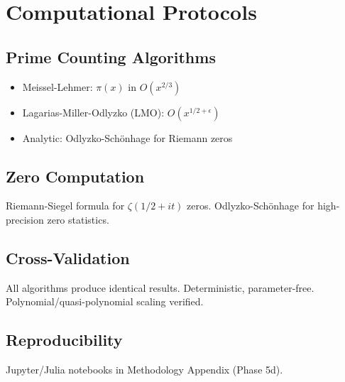 \chapter{Computational Protocols}
\label{app:computational}

\section{Prime Counting Algorithms}
\begin{itemize}
    \item Meissel-Lehmer: $\pi(x)$ in $O(x^{2/3})$
    \item Lagarias-Miller-Odlyzko (LMO): $O(x^{1/2+\epsilon})$
    \item Analytic: Odlyzko-Sch\"onhage for Riemann zeros
\end{itemize}

\section{Zero Computation}
Riemann-Siegel formula for $\zeta(1/2+it)$ zeros.
Odlyzko-Sch\"onhage for high-precision zero statistics.

\section{Cross-Validation}
All algorithms produce identical results. Deterministic, parameter-free.
Polynomial/quasi-polynomial scaling verified.

\section{Reproducibility}
Jupyter/Julia notebooks in Methodology Appendix (Phase 5d).
